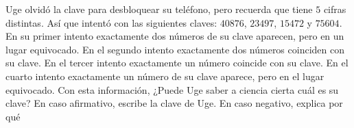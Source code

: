 Uge olvidó la clave para desbloquear su teléfono, pero recuerda que tiene $5$ cifras distintas. Así que intentó con las siguientes claves: $40876$, $23497$, $15472$ y $75604$. En su primer intento exactamente dos números de su clave aparecen, pero en un lugar equivocado. En el segundo intento exactamente dos números coinciden con su clave. En el tercer intento exactamente un número coincide con su clave. En el cuarto intento exactamente un número de su clave aparece, pero en el lugar equivocado. Con esta información, ¿Puede Uge saber a ciencia cierta cuál es su clave? En caso afirmativo, escribe la clave de Uge. En caso negativo, explica por qué